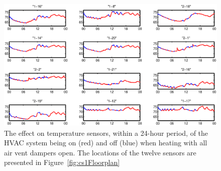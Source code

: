\begin{figure}
\begin{center}
\includegraphics[width=0.8\columnwidth]{fig/1daytemponoff.eps}
\end{center}
\caption[Effect of HVAC system on temperature sensors]{The effect on temperature
sensors, within a 24-hour period, of the HVAC system being on (red) and off
(blue) when heating with all air vent dampers open. The locations of the twelve
sensors are presented in Figure~\ref{fig:cs1Floorplan}}
\label{fig:hvacOnOffAffect}
\end{figure}

